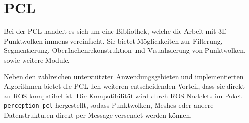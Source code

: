 \section{\acl{PCL}}
\label{sec:pcl}

Bei der \ac{PCL} \cite{rusu2011pcl} handelt es sich um eine Bibliothek, welche die Arbeit mit 3D-Punktwolken immens vereinfacht.
Sie bietet Möglichkeiten zur Filterung, Segmentierung, Oberflächenrekonstruktion und Visualisierung von Punktwolken, sowie weitere Module.

Neben den zahlreichen unterstützten Anwendungsgebieten und implementierten Algorithmen bietet die \ac{PCL} den weiteren entscheidenden Vorteil, dass sie direkt zu \ac{ROS} kompatibel ist.
Die Kompatibilität wird durch ROS-Nodelets im Paket \texttt{perception\_pcl} hergestellt, sodass Punktwolken, Meshes oder andere Datenstrukturen direkt per Message versendet werden können.
